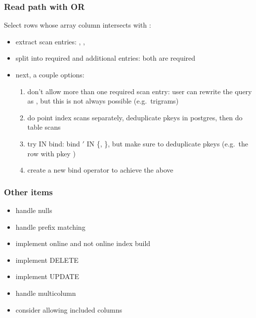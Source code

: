 \begin{frame}
  \frametitle{Read path with OR}
  Select rows whose array column intersects with :

  \pause

  \begin{itemize}
    \item extract scan entries: , , 
      \pause
    \item split into required and additional entries: both are required
      \pause
    \item next, a couple options:
      \pause
      \begin{enumerate}
        \item don't allow more than one required scan entry: user can rewrite
          the query as , but this is not always
          possible (e.g.\ trigrams)
          \pause
        \item do point index scans separately, deduplicate pkeys in postgres,
          then do table scans
          \pause
        \item try IN bind: bind $'$ IN \{,
          \}, but make sure to deduplicate pkeys (e.g.\ the row
          with pkey )
          \pause
        \item create a new bind operator to achieve the above
      \end{enumerate}
  \end{itemize}
\end{frame}

\begin{frame}
  \frametitle{Other items}
  \begin{itemize}
    \item handle nulls
      \pause
    \item handle prefix matching
      \pause
    \item implement online and not online index build
      \pause
    \item implement DELETE
      \pause
    \item implement UPDATE
      \pause
    \item handle multicolumn
      \pause
    \item consider allowing included columns
  \end{itemize}
\end{frame}
